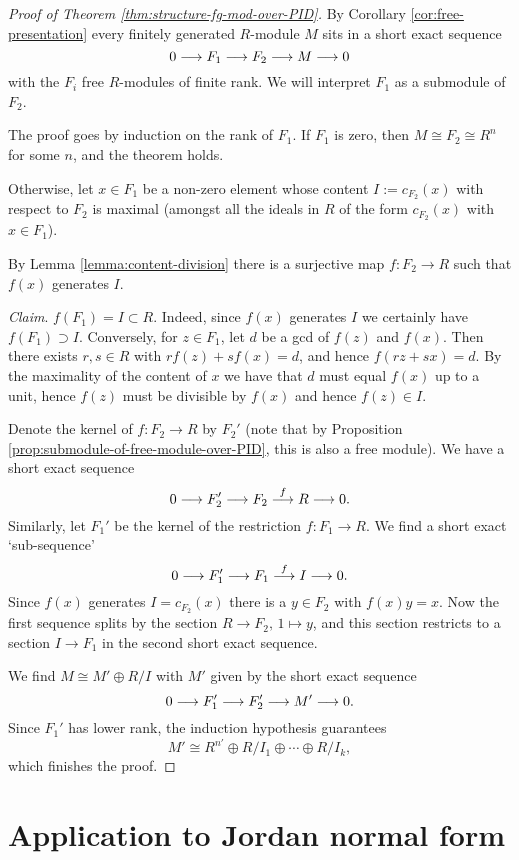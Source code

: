 \begin{proof}[Proof of Theorem \ref{thm:structure-fg-mod-over-PID}]
By Corollary \ref{cor:free-presentation} every finitely generated $R$-module $M$ sits in a short exact sequence
\[
	0 \longrightarrow F_1 \longrightarrow F_2 \longrightarrow M \longrightarrow 0
\]
with the $F_i$ free $R$-modules of finite rank. We will interpret $F_1$ as a submodule of $F_2$.

The proof goes by induction on the rank of $F_1$. If $F_1$ is zero, then $M\cong F_2\cong R^n$ for some $n$, and the theorem holds.

Otherwise, let  $x\in F_1$  be a non-zero element whose content $I := c_{F_2}(x)$ with respect to $F_2$ is maximal (amongst all the ideals in $R$ of the form $c_{F_2}(x)$ with $x\in F_1$). 

By Lemma \ref{lemma:content-division} there is a surjective map $f\colon F_2 \to R$ such that $f(x)$ generates $I$. 

\emph{Claim}. $f(F_1) = I \subset R$. Indeed, since $f(x)$ generates $I$ we certainly have $f(F_1)\supset I$. Conversely, for $z\in F_1$, let $d$ be a gcd of $f(z)$ and $f(x)$. Then there exists $r, s\in R$ with $rf(z)+sf(x)=d$, and hence $f(rz+sx)=d$. By the maximality of the content of $x$ we have that $d$ must equal $f(x)$ up to a unit, hence $f(z)$ must be divisible by $f(x)$ and hence $f(z)\in I$.

Denote the kernel of $f\colon F_2 \to R$ by $F_2'$ (note that by Proposition \ref{prop:submodule-of-free-module-over-PID}, this is also a free module). We have a short exact sequence
\[
	0 \longrightarrow F_2' \longrightarrow F_2 \overset{f}{\longrightarrow} R \longrightarrow 0.
\]
Similarly, let $F_1'$ be the kernel of the restriction $f\colon F_1 \to R$. We find a short exact `sub-sequence'
\[
	0 \longrightarrow F_1' \longrightarrow F_1 \overset{f}{\longrightarrow} I \longrightarrow 0.
\]
Since $f(x)$ generates $I = c_{F_2}(x)$ there is a $y\in F_2$ with $f(x)y = x$. Now 
the first sequence splits by the section $R\to F_2,\, 1\mapsto y$, and this section restricts to a section
$I\to F_1$ in the second short exact sequence.

We find $M\cong M' \oplus R/I$ with $M'$ given by the short exact sequence
\[
	0 \longrightarrow F_1' \longrightarrow F_2' \longrightarrow M' \longrightarrow 0.
\]
Since $F_1'$ has lower rank, the induction hypothesis guarantees
\[
	M' \cong R^{n'} \oplus R/I_1 \oplus \cdots \oplus R/I_k,
\]
which finishes the proof.
\end{proof}


\section{Application to Jordan normal form}


